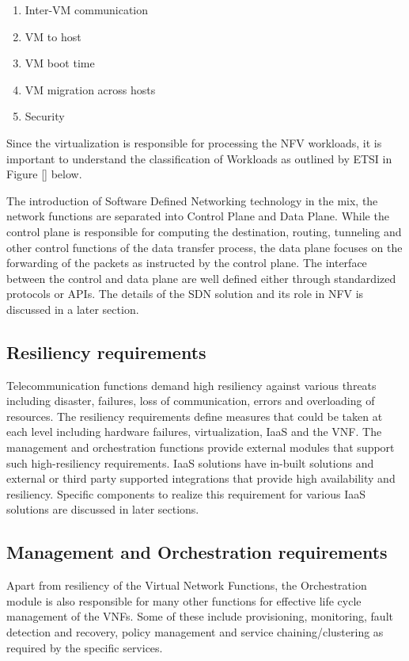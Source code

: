 \begin{enumerate}
    \item Inter-VM communication
    \item VM to host 
    \item VM boot time
    \item VM migration across hosts
    \item Security
\end{enumerate}


Since the virtualization is responsible for processing the NFV workloads, it is important to understand the classification of Workloads as outlined by ETSI in Figure [] below.

The introduction of Software Defined Networking technology in the mix, the network functions are separated into Control Plane and Data Plane. While the control plane is responsible for computing the destination, routing, tunneling and other control functions of the data transfer process, the data plane focuses on the forwarding of the packets as instructed by the control plane. The interface between the control and data plane are well defined either through standardized protocols or APIs. The details of the SDN solution and its role in NFV is discussed in a later section. 

	
\subsection{Resiliency requirements}

Telecommunication functions demand high resiliency against various threats including disaster, failures, loss of communication, errors and overloading of resources. The resiliency requirements define measures that could be taken at each level including hardware failures, virtualization, IaaS and the VNF\@. The management and orchestration functions provide external modules that support such high-resiliency requirements. IaaS solutions have in-built solutions and external or third party supported integrations that provide high availability and resiliency. Specific components to realize this requirement for various IaaS solutions are discussed in later sections.

	
\subsection{Management and Orchestration requirements}

Apart from resiliency of the Virtual Network Functions, the Orchestration module is also responsible for many other functions for effective life cycle management of the VNFs. Some of these include provisioning, monitoring, fault detection and recovery, policy management and service chaining/clustering as required by the specific services.
